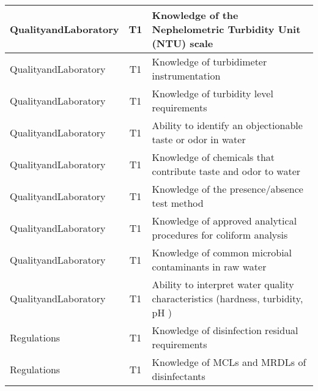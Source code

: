 \documentclass{article}
\begin{document}
\begin{table}[]
\begin{tabular}{|l|c|l|}
QualityandLaboratory                   & T1             & Knowledge of the   Nephelometric Turbidity Unit (NTU) scale                                                                       \\ \hline
QualityandLaboratory                   & T1             & Knowledge of   turbidimeter instrumentation                                                                                       \\ \hline
QualityandLaboratory                   & T1             & Knowledge of   turbidity level requirements                                                                                       \\ \hline
QualityandLaboratory                   & T1             & Ability to identify   an objectionable taste or odor in water                                                                     \\ \hline
QualityandLaboratory                   & T1             & Knowledge of   chemicals that contribute taste and odor to water                                                                  \\ \hline
QualityandLaboratory                   & T1             & Knowledge of the   presence/absence test method                                                                                   \\ \hline
QualityandLaboratory                   & T1             & Knowledge of approved   analytical procedures for coliform analysis                                                               \\ \hline
QualityandLaboratory                   & T1             & Knowledge of common   microbial contaminants in raw water                                                                         \\ \hline
QualityandLaboratory                   & T1             & Ability to interpret   water quality characteristics (hardness, turbidity, pH )                                                   \\ \hline
Regulations                            & T1             & Knowledge of   disinfection residual requirements                                                                                 \\ \hline
Regulations                            & T1             & Knowledge of MCLs and   MRDLs of disinfectants                                                                                    \\ \hline

\end{tabular}
\end{table}
\end{document}
